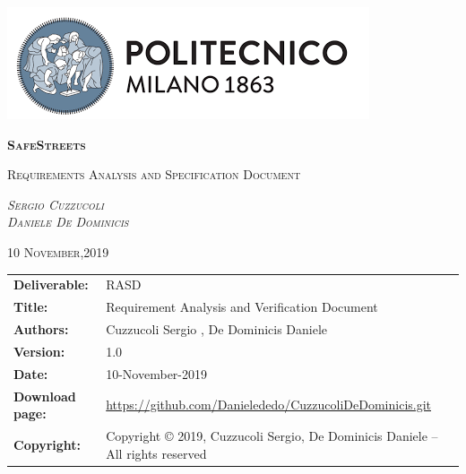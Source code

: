 





\begin{titlepage}
	\centering
	\includegraphics[width=\textwidth]{Images/PolimiLogo}\par\vspace{1cm}
	{\scshape\Huge\textbf{SafeStreets}\par}
	\vspace{1cm}
	{\scshape\Large Requirements Analysis and Specification Document\par}
	\vspace{2cm}
	{\scshape\Large\emph{Sergio Cuzzucoli}\\ \emph{Daniele De Dominicis}\par}
	\vspace{4cm}
	{\scshape\normalsize{10 November,2019}}

\end{titlepage}

\begin{table}[h!]
\begin{tabu} to \textwidth { X[0.3,r,p] X[0.7,l,p] }
\hline

\textbf{Deliverable:} & RASD\\
\textbf{Title:} & Requirement Analysis and Verification Document \\
\textbf{Authors:} & Cuzzucoli Sergio , De Dominicis Daniele \\
\textbf{Version:} & 1.0 \\ 
\textbf{Date:} & 10-November-2019  \\
\textbf{Download page:} & \href{https://github.com/Danielededo/CuzzucoliDeDominicis.git}{https://github.com/Danielededo/CuzzucoliDeDominicis.git} \\
\textbf{Copyright:} & Copyright © 2019, Cuzzucoli Sergio, De Dominicis Daniele – All rights reserved \\
\hline
\end{tabu}
\end{table}




